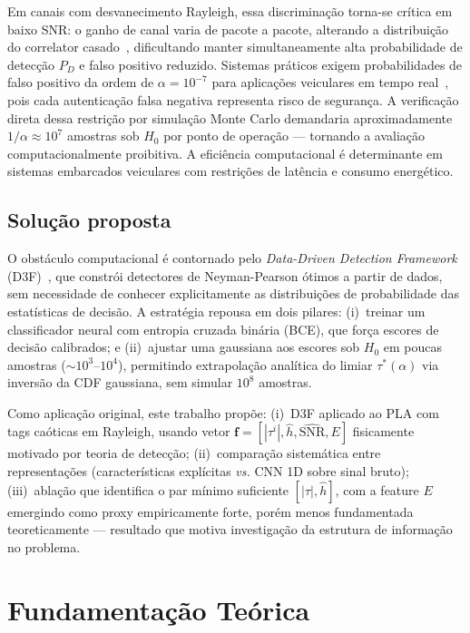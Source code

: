 \documentclass[12pt,a4paper]{article}
\begin{document}
Em canais com desvanecimento Rayleigh, essa discriminação torna-se crítica em baixo SNR: o ganho de canal varia de pacote a pacote, alterando a distribuição do correlator casado~\cite{ref_xie}, dificultando manter simultaneamente alta probabilidade de detecção $P_D$ e falso positivo reduzido. Sistemas práticos exigem probabilidades de falso positivo da ordem de $\alpha = 10^{-7}$ para aplicações veiculares em tempo real~\cite{ref_raya,ref_xie}, pois cada autenticação falsa negativa representa risco de segurança. A verificação direta dessa restrição por simulação Monte Carlo demandaria aproximadamente $1/\alpha \approx 10^7$ amostras sob $H_0$ por ponto de operação — tornando a avaliação computacionalmente proibitiva. A eficiência computacional é determinante em sistemas embarcados veiculares com restrições de latência e consumo energético.

\subsection{Solução proposta}

O obstáculo computacional é contornado pelo \textit{Data-Driven Detection Framework} (D3F)~\cite{ref_braca}, que constrói detectores de Neyman-Pearson ótimos a partir de dados, sem necessidade de conhecer explicitamente as distribuições de probabilidade das estatísticas de decisão. A estratégia repousa em dois pilares: (i)~treinar um classificador neural com entropia cruzada binária (BCE), que força escores de decisão calibrados; e (ii)~ajustar uma gaussiana aos escores sob $H_0$ em poucas amostras ($\sim 10^3$--$10^4$), permitindo extrapolação analítica do limiar $\tau^*(\alpha)$ via inversão da CDF gaussiana, sem simular $10^8$ amostras.

Como aplicação original, este trabalho propõe: (i)~D3F aplicado ao PLA com tags caóticas em Rayleigh, usando vetor $\mathbf{f} = [|\tau^i|, \hat{h}, \widehat{\text{SNR}}, E]$ fisicamente motivado por teoria de detecção; (ii)~comparação sistemática entre representações (características explícitas \textit{vs.} CNN 1D sobre sinal bruto); (iii)~ablação que identifica o par mínimo suficiente $[|\tau|, \hat{h}]$, com a feature $E$ emergindo como proxy empiricamente forte, porém menos fundamentada teoreticamente — resultado que motiva investigação da estrutura de informação no problema.

\section{Fundamentação Teórica}
\end{document}

